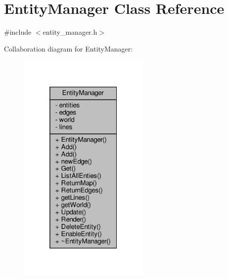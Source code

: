 \hypertarget{classEntityManager}{}\section{Entity\+Manager Class Reference}
\label{classEntityManager}


{\ttfamily \#include $<$entity\+\_\+manager.\+h$>$}



Collaboration diagram for Entity\+Manager\+:
\nopagebreak
\begin{figure}[H]
\begin{center}
\leavevmode
\includegraphics[width=181pt]{classEntityManager__coll__graph}
\end{center}
\end{figure}
